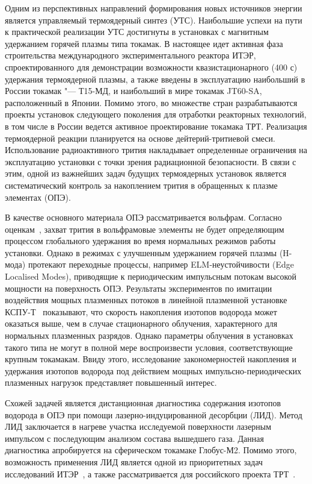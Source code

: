 
{\actuality} Одним из перспективных направлений формирования новых источников энергии является управляемый термоядерный синтез (УТС). 
Наибольшие успехи на пути к практической реализации УТС достигнуты в установках с магнитным удержанием горячей плазмы типа токамак. 
В настоящее идет активная фаза строительства международного экспериментального реактора ИТЭР, спроектированного для демонстрации 
возможности квазистационарного (400 с) удержания термоядерной плазмы, а также введены в эксплуатацию наибольший в России токамак "--- Т15-МД, 
и наибольший в мире токамак JT60-SA, расположенный в Японии. Помимо этого, во множестве стран разрабатываются проекты установок следующего 
поколения для отработки реакторных технологий, в том числе в России ведется активное проектирование токамака ТРТ. Реализация термоядерной реакции 
планируется на основе дейтерий-тритиевой смеси. Использование радиоактивного трития накладывает определенные ограничения на эксплуатацию установки 
с точки зрения радиационной безопасности. В связи с этим, одной из важнейших задач будущих термоядерных установок является систематический контроль 
за накоплением трития в обращенных к плазме элементах (ОПЭ). 

В качестве основного материала ОПЭ рассматривается вольфрам. Согласно оценкам~\cite{Roth1}, захват трития в вольфрамовые элементы не будет определяющим 
процессом глобального удержания во время нормальных режимов работы установки. Однако в режимах с улучшенным удержанием горячей плазмы (H-мода) протекают 
переходные процессы, например ELM-неустойчивости (Edge Localised Modes), приводящие к периодическим импульсным потокам высокой мощности на поверхность ОПЭ. 
Результаты экспериментов по имитации воздействия мощных плазменных потоков в линейной плазменной установке КСПУ-Т~\cite{Ogorodnikova} показывают, что скорость 
накопления изотопов водорода может оказаться выше, чем в случае стационарного облучения, характерного для нормальных плазменных разрядов. Однако параметры 
облучения в установках такого типа не могут в полной мере воспроизвести условия, соответствующие крупным токамакам. Ввиду этого, исследование закономерностей 
накопления и удержания изотопов водорода под действием мощных импульсно-периодических плазменных нагрузок представляет повышенный интерес.
 
Схожей задачей является дистанционная диагностика содержания изотопов водорода в ОПЭ при помощи лазерно-индуцированной десорбции (ЛИД). Метод ЛИД 
заключается в нагреве участка исследуемой поверхности лазерным импульсом с последующим анализом состава вышедшего газа. Данная диагностика апробируется 
на сферическом токамаке Глобус-М2. Помимо этого, возможность применения ЛИД является одной из приоритетных задач исследований ИТЭР~\cite{loarte2020required}, 
а также рассматривается для российского проекта ТРТ~\cite{Razdobarin2022}.


